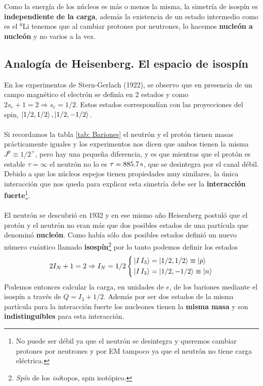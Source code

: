 \\\\ Como la energía de los núcleos es más o menos la misma, la simetría de isospín es \textbf{independiente de la carga}, además la existencia de un estado intermedio como es el $^6\text{Li}$ tenemos que al cambiar protones por neutrones, lo hacemos \textbf{nucleón a nucleón} y no varios a la vez.
\subsection{Analogía de Heisenberg. El espacio de isospín}
En los experimentos de Stern-Gerlach (1922), se observo que en presencia de un campo magnético el electrón se definía en 2 estados y como $2s_e+1=2 \Rightarrow s_e=1/2$. Estos estados correspondían con las proyecciones del spin, $\ket{1/2,1/2},\ket{1/2,-1/2}$.
\\\\
Si recordamos la tabla \ref{tab: Bariones} el neutrón y el protón tienen masas prácticamente iguales y los experimentos nos dicen que ambos tienen la misma $J^p\equiv 1/2^+$, pero hay una pequeña diferencia, y es que mientras que el protón es estable $\tau=\infty$ el neutrón no lo es $\tau=\unit[885.7]{s}$, que se desintegra por el canal débil. Debido a que los núcleos espejos tienen propiedades muy similares, la única interacción que nos queda para explicar esta simetría debe ser la \textbf{interacción fuerte}\footnote{No puede ser débil ya que el neutrón se desintegra y queremos cambiar protones por neutrones y por EM tampoco ya que el neutrón no tiene carga eléctrica.}. \\\\
El neutrón se descubrió en 1932 y en ese mismo año Heisenberg postuló que el protón y el neutrón no eran más que dos posibles estados de una partícula que denominó \textbf{nucleón}. Como había sólo dos posibles estados definió un nuevo número cuántico llamado \textbf{isospín}\footnote{\textit{Spín} de los \textit{isó}topos, spin isotópico.} por lo tanto podemos definir los estados
\begin{equation*}
    2I_N+1=2 \Rightarrow I_N=1/2 \left \{ \begin{aligned}
        &\ket{I\,I_3}=\ket{1/2 , 1/2}\equiv \ket{p}\\
        &\ket{I\,I_3}=\ket{1/2 , -1/2}\equiv \ket{n}
    \end{aligned} \right.
\end{equation*}
Podemos entonces calcular la carga, en unidades de $e$, de los bariones mediante el isospín a través de $Q=I_3+1/2$. Además por ser dos estados de la misma partícula para la interacción fuerte los nucleones tienen la \textbf{misma masa} y son \textbf{indistinguibles} para esta interacción.

